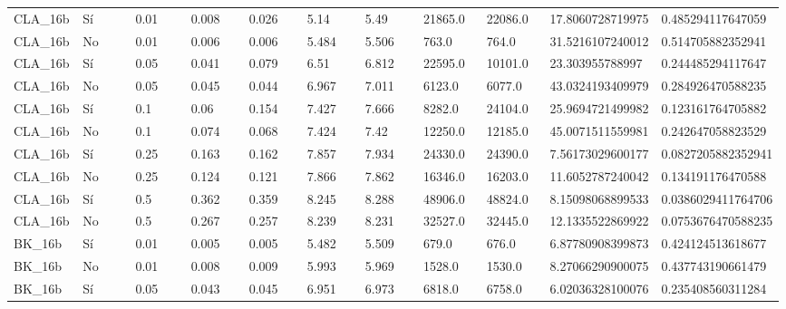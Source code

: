 {{\begin{longtable}{M{0.09\linewidth}M{0.09\linewidth}M{0.09\linewidth}M{0.09\linewidth}M{0.09\linewidth}M{0.09\linewidth}M{0.09\linewidth}M{0.09\linewidth}M{0.09\linewidth}M{0.09\linewidth}M{0.09\linewidth}}
CLA\_16b & Sí & \num{0.01} & \num{0.008} & \num{0.026} & \num{5.14} & \num{5.49} & \num{21865.0} & \num{22086.0} & \num{17.8060728719975} & \num{0.485294117647059} \\
CLA\_16b & No & \num{0.01} & \num{0.006} & \num{0.006} & \num{5.484} & \num{5.506} & \num{763.0} & \num{764.0} & \num{31.5216107240012} & \num{0.514705882352941} \\
CLA\_16b & Sí & \num{0.05} & \num{0.041} & \num{0.079} & \num{6.51} & \num{6.812} & \num{22595.0} & \num{10101.0} & \num{23.303955788997} & \num{0.244485294117647} \\
CLA\_16b & No & \num{0.05} & \num{0.045} & \num{0.044} & \num{6.967} & \num{7.011} & \num{6123.0} & \num{6077.0} & \num{43.0324193409979} & \num{0.284926470588235} \\
CLA\_16b & Sí & \num{0.1} & \num{0.06} & \num{0.154} & \num{7.427} & \num{7.666} & \num{8282.0} & \num{24104.0} & \num{25.9694721499982} & \num{0.123161764705882} \\
CLA\_16b & No & \num{0.1} & \num{0.074} & \num{0.068} & \num{7.424} & \num{7.42} & \num{12250.0} & \num{12185.0} & \num{45.0071511559981} & \num{0.242647058823529} \\
CLA\_16b & Sí & \num{0.25} & \num{0.163} & \num{0.162} & \num{7.857} & \num{7.934} & \num{24330.0} & \num{24390.0} & \num{7.56173029600177} & \num{0.0827205882352941} \\
CLA\_16b & No & \num{0.25} & \num{0.124} & \num{0.121} & \num{7.866} & \num{7.862} & \num{16346.0} & \num{16203.0} & \num{11.6052787240042} & \num{0.134191176470588} \\
CLA\_16b & Sí & \num{0.5} & \num{0.362} & \num{0.359} & \num{8.245} & \num{8.288} & \num{48906.0} & \num{48824.0} & \num{8.15098068899533} & \num{0.0386029411764706} \\
CLA\_16b & No & \num{0.5} & \num{0.267} & \num{0.257} & \num{8.239} & \num{8.231} & \num{32527.0} & \num{32445.0} & \num{12.1335522869922} & \num{0.0753676470588235} \\
BK\_16b & Sí & \num{0.01} & \num{0.005} & \num{0.005} & \num{5.482} & \num{5.509} & \num{679.0} & \num{676.0} & \num{6.87780908399873} & \num{0.424124513618677} \\
BK\_16b & No & \num{0.01} & \num{0.008} & \num{0.009} & \num{5.993} & \num{5.969} & \num{1528.0} & \num{1530.0} & \num{8.27066290900075} & \num{0.437743190661479} \\
BK\_16b & Sí & \num{0.05} & \num{0.043} & \num{0.045} & \num{6.951} & \num{6.973} & \num{6818.0} & \num{6758.0} & \num{6.02036328100076} & \num{0.235408560311284} \\

\end{longtable}}}
